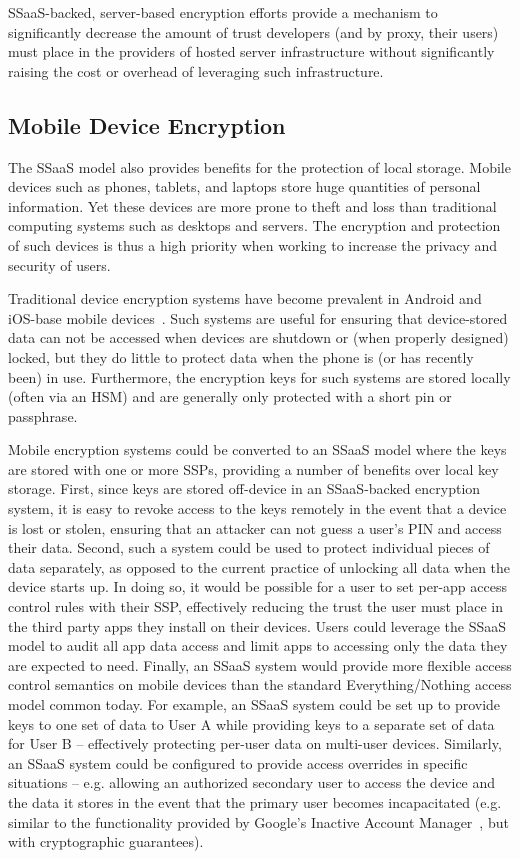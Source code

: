 SSaaS-backed, server-based encryption efforts provide a mechanism to
significantly decrease the amount of trust developers (and by proxy,
their users) must place in the providers of hosted server
infrastructure without significantly raising the cost or overhead of
leveraging such infrastructure.

\subsection{Mobile Device Encryption}

The SSaaS model also provides benefits for the protection of local
storage. Mobile devices such as phones, tablets, and laptops store
huge quantities of personal information. Yet these devices are more
prone to theft and loss than traditional computing systems such as
desktops and servers. The encryption and protection of such devices is
thus a high priority when working to increase the privacy and security
of users.

Traditional device encryption systems have become prevalent in Android
and iOS-base mobile devices~\cite{ars-android-encrypt,
  ars-ios-encrypt}. Such systems are useful for ensuring that
device-stored data can not be accessed when devices are shutdown or
(when properly designed) locked, but they do little to protect data
when the phone is (or has recently been) in use. Furthermore, the
encryption keys for such systems are stored locally (often via an HSM)
and are generally only protected with a short pin or passphrase.

Mobile encryption systems could be converted to an SSaaS model where
the keys are stored with one or more SSPs, providing a number of
benefits over local key storage. First, since keys are stored
off-device in an SSaaS-backed encryption system, it is easy to revoke
access to the keys remotely in the event that a device is lost or
stolen, ensuring that an attacker can not guess a user's PIN and
access their data. Second, such a system could be used to protect
individual pieces of data separately, as opposed to the current
practice of unlocking all data when the device starts up. In doing so,
it would be possible for a user to set per-app access control rules
with their SSP, effectively reducing the trust the user must place in
the third party apps they install on their devices. Users could
leverage the SSaaS model to audit all app data access and limit apps
to accessing only the data they are expected to need. Finally, an
SSaaS system would provide more flexible access control semantics on
mobile devices than the standard Everything/Nothing access model
common today. For example, an SSaaS system could be set up to provide
keys to one set of data to User A while providing keys to a separate
set of data for User B -- effectively protecting per-user data on
multi-user devices. Similarly, an SSaaS system could be configured to
provide access overrides in specific situations -- e.g. allowing an
authorized secondary user to access the device and the data it stores
in the event that the primary user becomes incapacitated (e.g. similar
to the functionality provided by Google's Inactive Account
Manager~\cite{atlantic-google-iam}, but with cryptographic
guarantees).

